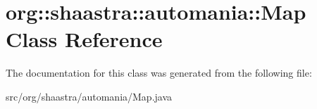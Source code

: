 \hypertarget{classorg_1_1shaastra_1_1automania_1_1Map}{
\section{\-o\-r\-g\-:\-:\-s\-h\-a\-a\-s\-t\-r\-a\-:\-:\-a\-u\-t\-o\-m\-a\-n\-i\-a\-:\-:\-M\-a\-p \-C\-l\-a\-s\-s \-R\-e\-f\-e\-r\-e\-n\-c\-e}
\label{classorg_1_1shaastra_1_1automania_1_1Map}
}


The documentation for this class was generated from the following file:\begin{DoxyCompactItemize}
\item 
\-s\-r\-c\-/\-o\-r\-g\-/\-s\-h\-a\-a\-s\-t\-r\-a\-/\-a\-u\-t\-o\-m\-a\-n\-i\-a\-/\-M\-a\-p\-.\-j\-a\-v\-a\end{DoxyCompactItemize}
